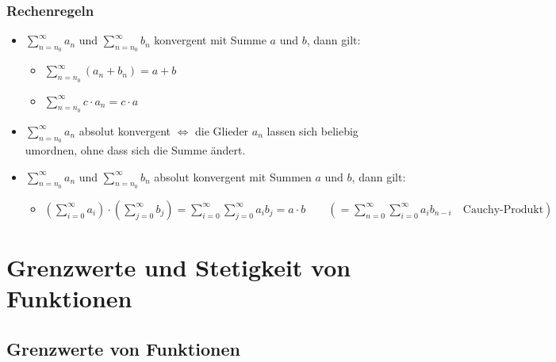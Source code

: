 \subsubsection{Rechenregeln}
\begin{itemize}
\item $\sum_{n=n_0}^\infty a_n$ und $\sum_{n=n_0}^\infty b_n$ konvergent mit Summe $a$ und $b$, dann gilt: 
\begin{itemize}
\item $\sum_{n=n_0}^\infty (a_n+b_n)= a + b$
\item $\sum_{n=n_0}^\infty c\cdot a_n= c\cdot a$
\end{itemize}
\item $\sum_{n=n_0}^\infty a_n$ absolut konvergent $\Leftrightarrow$ die Glieder $a_n$ lassen sich beliebig umordnen, ohne dass sich die Summe ändert.
\item $\sum_{n=n_0}^\infty a_n$ und $\sum_{n=n_0}^\infty b_n$ absolut konvergent mit Summen $a$ und $b$, dann gilt:
\begin{itemize}
\item $\left(\sum_{i=0}^\infty a_i\right)\cdot \left( \sum_{j=0}^\infty b_j\right)=\sum_{i=0}^\infty  \sum_{j=0}^\infty a_i b_j=a\cdot b \qquad \left( =\sum_{n=0}^\infty  \sum_{i=0}^\infty a_i b_{n-i} \quad \text{Cauchy-Produkt}\right)$
\end{itemize}
\end{itemize}

\section{Grenzwerte und Stetigkeit von Funktionen}
\subsection{Grenzwerte von Funktionen}
